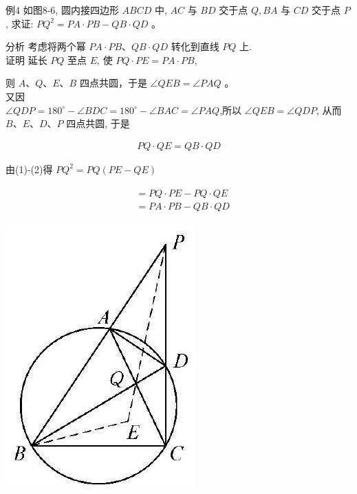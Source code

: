 \documentclass[10pt]{article}
\begin{document}
例4 如图8-6, 圆内接四边形 $A B C D$ 中, $A C$ 与 $B D$ 交于点 $Q, B A$ 与 $C D$ 交于点 $P$, 求证: $P Q^{2}=P A \cdot P B-Q B \cdot Q D$ 。

分析 考虑将两个幂 $P A \cdot P B 、 Q B \cdot Q D$ 转化到直线 $P Q$ 上.\\
证明 延长 $P Q$ 至点 $E$, 使 $P Q \cdot P E=P A \cdot P B$,

则 $A 、 Q 、 E 、 B$ 四点共圆，于是 $\angle Q E B=\angle P A Q$ 。\\
又因\\
$\angle Q D P=180^{\circ}-\angle B D C=180^{\circ}-\angle B A C=\angle P A Q$,所以 $\angle Q E B=\angle Q D P$, 从而 $B 、 E 、 D 、 P$ 四点共圆, 于是

\begin{align*}
P Q \cdot Q E=Q B \cdot Q D \tag{2}
\end{align*}

由(1)-(2)得 $P Q^{2}=P Q(P E-Q E)$

\begin{align*}
\begin{aligned}
& =P Q \cdot P E-P Q \cdot Q E \\
& =P A \cdot P B-Q B \cdot Q D
\end{aligned}
\end{align*}

\begin{center}
\includegraphics[max width=\textwidth]{2024_10_30_66b8e5e701da2093c133g-060(2)}
\end{center}
\end{document}
